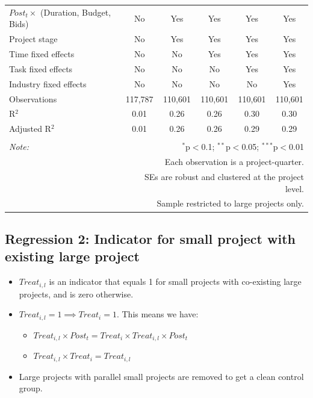\documentclass[
]{article}
\providecommand{\tightlist}{%
  \setlength{\itemsep}{0pt}\setlength{\parskip}{0pt}}
\begin{document}
\begin{table}[H]
\begin{tabular}{@{\extracolsep{-10pt}}lccccc}
$Post_t \times $  (Duration, Budget, Bids) & No & Yes & Yes & Yes & Yes \\ 
Project stage & No & Yes & Yes & Yes & Yes \\ 
Time fixed effects & No & No & Yes & Yes & Yes \\ 
Task fixed effects & No & No & No & Yes & Yes \\ 
Industry fixed effects & No & No & No & No & Yes \\ 
Observations & 117,787 & 110,601 & 110,601 & 110,601 & 110,601 \\ 
R$^{2}$ & 0.01 & 0.26 & 0.26 & 0.30 & 0.30 \\ 
Adjusted R$^{2}$ & 0.01 & 0.26 & 0.26 & 0.29 & 0.29 \\ 
\hline 
\hline \\[-1.8ex] 
\textit{Note:}  & \multicolumn{5}{r}{$^{*}$p$<$0.1; $^{**}$p$<$0.05; $^{***}$p$<$0.01} \\ 
 & \multicolumn{5}{r}{Each observation is a project-quarter.} \\ 
 & \multicolumn{5}{r}{SEs are robust and clustered at the project level.} \\ 
 & \multicolumn{5}{r}{Sample restricted to large projects only.} \\ 
\end{tabular} 
\end{table}

\hypertarget{regression-2-indicator-for-small-project-with-existing-large-project}{%
\subsection{Regression 2: Indicator for small project with existing
large
project}\label{regression-2-indicator-for-small-project-with-existing-large-project}}

\begin{itemize}
\tightlist
\item
  \(Treat_{i,l}\) is an indicator that equals 1 for small projects with
  co-existing large projects, and is zero otherwise.
\item
  \(Treat_{i,l}=1 \implies Treat_i = 1\). This means we have:

  \begin{itemize}
  \tightlist
  \item
    \(Treat_{i,l} \times Post_t = Treat_i \times Treat_{i,l} \times Post_t\)
  \item
    \(Treat_{i,l} \times Treat_i = Treat_{i,l}\)
  \end{itemize}
\item
  Large projects with parallel small projects are removed to get a clean
  control group.
\end{itemize}
\end{document}
